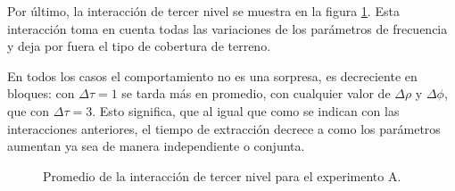 Por último, la interacción de tercer nivel se muestra en la figura \ref{tab:3I-A}. Esta interacción toma en cuenta todas las variaciones de los parámetros de frecuencia y deja por fuera el tipo de cobertura de terreno.

En todos los casos el comportamiento no es una sorpresa,  es decreciente en bloques: con $\Delta \tau=1$ se tarda más en promedio, con cualquier valor de $\Delta \rho$ y $\Delta \phi$, que con $\Delta \tau=3$. Esto significa, que al igual que como se indican con las interacciones anteriores, el tiempo de extracción decrece a como los parámetros aumentan ya sea de manera independiente o conjunta.



\begin{figure}[H]
    \centering
\caption{Promedio de la interacción de tercer nivel para el experimento A.}
\label{tab:3I-A}
\end{figure}


